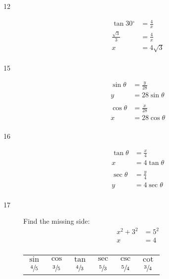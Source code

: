 \documentclass{exam}
\newcommand{\degree}{\ensuremath{^\circ}}
\begin{document}
\begin{description}
      \item[12]
        \begin{align*}
          \tan 30 \degree    & = \frac{4}{x} \\
          \frac{\sqrt{3}}{3} & = \frac{4}{x}  \\
          x                  & = \boxed{ 4 \sqrt{3} } \\
        \end{align*}

      \item[15]
        \begin{align*}
          \sin \theta & = \frac{y}{28} \\
          y           & = \boxed{ 28 \sin \theta } \\
          \\
          \cos \theta & = \frac{x}{28} \\
          x           & = \boxed{ 28 \cos \theta } \\
        \end{align*}

      \item[16]
        \begin{align*}
          \tan \theta & = \frac{x}{4} \\
          x           & = \boxed{ 4 \tan \theta } \\
          \\
          \sec \theta & = \frac{y}{4} \\
          y           & = \boxed{ 4 \sec \theta } \\
        \end{align*}

      \item[17] 
        Find the missing side:
        \begin{align*}
          x^2 + 3^2 & = 5^2 \\
          x         & = 4 \\
        \end{align*}

        \begin{tabular}[H]{cccccc}
          \toprule
          $\sin$          & $\cos$           & $\tan$          & $\sec$           & $\csc$          & $\cot$ \\
          $\sfrac{4}{5}$ & $\sfrac{3}{5}$ & $\sfrac{4}{3}$ & $\sfrac{5}{3}$ & $\sfrac{5}{4}$ & $\sfrac{3}{4}$ \\
          \bottomrule
        \end{tabular}


\end{description}
\end{document}
